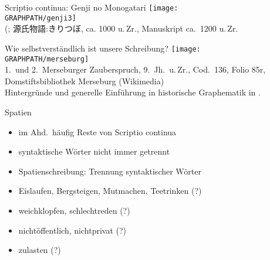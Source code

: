 \begin{frame}
  {Scriptio continua: Genji no Monogatari}
  \centering
  \texttt{[image: \\GRAPHPATH/genji3]}\\
  {\tiny (\citealt{Rickmeyer1991}; 源氏物語:きりつぼ, ca. 1000 u.\,Zr., Manuskript ca.\ 1200 u.\,Zr.}
\end{frame}

\begin{frame}
  {Wie selbstverständlich ist unsere Schreibung?}
  \pause
  \centering
  \texttt{[image: \\GRAPHPATH/merseburg]}\\[0.5\baselineskip]
  {\tiny 1.~und 2.~Merseburger Zauberspruch, 9.~Jh.\ u.\,Zr., Cod.\ 136, Folio 85r, Domstiftsbibliothek Merseburg (Wikimedia)\\[-1\baselineskip]
    Hintergründe und generelle Einführung in historische Graphematik in \citet{Elmentaler2018}.}
\end{frame}

\begin{frame}
  {Spatien}
  \pause
  \begin{itemize}[<+->]
    \item im Ahd.\ häufig Reste von Scriptio continua
    \item syntaktische Wörter nicht immer getrennt
    \item \alert{Spatienschreibung}: Trennung syntaktischer Wörter
  \end{itemize}
  \pause
  \Halbzeile
  \begin{exe}
    \ex
    \begin{xlist}
      \pause
    \end{xlist}
    \pause
    \Halbzeile
    \ex
    \begin{xlist}
      \pause
    \end{xlist}
  \end{exe}
  \pause
  \begin{itemize}[<+->]
    \item Eislaufen, Bergsteigen, Mutmachen, Teetrinken (?)
    \item weichklopfen, schlechtreden (?)
    \item nichtöffentlich, nichtprivat (?)
    \item zulasten (?)
  \end{itemize}
\end{frame}


